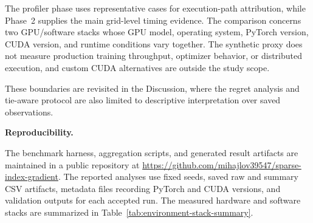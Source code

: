 The profiler phase uses representative cases for execution-path attribution, while Phase~2 supplies the main grid-level timing evidence. The comparison concerns two GPU/software stacks whose GPU model, operating system, PyTorch version, CUDA version, and runtime conditions vary together. The synthetic proxy does not measure production training throughput, optimizer behavior, or distributed execution, and custom CUDA alternatives are outside the study scope.

These boundaries are revisited in the Discussion, where the regret analysis and tie-aware protocol are also limited to descriptive interpretation over saved observations.

\noindent\textbf{Reproducibility.}

The benchmark harness, aggregation scripts, and generated result artifacts are maintained in a public repository at \url{https://github.com/mihajlov39547/sparse-index-gradient}. The reported analyses use fixed seeds, saved raw and summary CSV artifacts, metadata files recording PyTorch and CUDA versions, and validation outputs for each accepted run. The measured hardware and software stacks are summarized in Table~\ref{tab:environment-stack-summary}.
